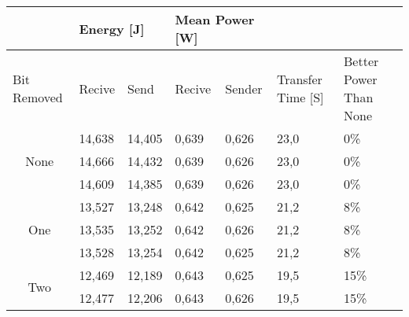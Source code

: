 \begin{table}[h]
\begin{tabular}{c|l|l|l|l|ll}
\cline{2-5}
\multicolumn{1}{l|}{}                       & \multicolumn{2}{l|}{Energy {[}J{]}} & \multicolumn{2}{l|}{Mean Power {[}W{]}} &                                            &                                             \\ \hline
\multicolumn{1}{|l|}{Bit Removed}           & Recive           & Send             & Recive             & Sender             & \multicolumn{1}{l|}{Transfer Time {[}S{]}} & \multicolumn{1}{l|}{Better Power Than None} \\ \hline
\multicolumn{1}{|c|}{\multirow{3}{*}{None}} & 14,638           & 14,405           & 0,639              & 0,626              & \multicolumn{1}{l|}{23,0}                  & \multicolumn{1}{l|}{0\%}                    \\ \cline{2-7} 
\multicolumn{1}{|c|}{}                      & 14,666           & 14,432           & 0,639              & 0,626              & \multicolumn{1}{l|}{23,0}                  & \multicolumn{1}{l|}{0\%}                    \\ \cline{2-7} 
\multicolumn{1}{|c|}{}                      & 14,609           & 14,385           & 0,639              & 0,626              & \multicolumn{1}{l|}{23,0}                  & \multicolumn{1}{l|}{0\%}                    \\ \hline
\multicolumn{1}{|c|}{\multirow{3}{*}{One}}  & 13,527           & 13,248           & 0,642              & 0,625              & \multicolumn{1}{l|}{21,2}                  & \multicolumn{1}{l|}{8\%}                    \\ \cline{2-7} 
\multicolumn{1}{|c|}{}                      & 13,535           & 13,252           & 0,642              & 0,626              & \multicolumn{1}{l|}{21,2}                  & \multicolumn{1}{l|}{8\%}                    \\ \cline{2-7} 
\multicolumn{1}{|c|}{}                      & 13,528           & 13,254           & 0,642              & 0,625              & \multicolumn{1}{l|}{21,2}                  & \multicolumn{1}{l|}{8\%}                    \\ \hline
\multicolumn{1}{|c|}{\multirow{3}{*}{Two}}  & 12,469           & 12,189           & 0,643              & 0,625              & \multicolumn{1}{l|}{19,5}                  & \multicolumn{1}{l|}{15\%}                   \\ \cline{2-7} 
\multicolumn{1}{|c|}{}                      & 12,477           & 12,206           & 0,643              & 0,626              & \multicolumn{1}{l|}{19,5}                  & \multicolumn{1}{l|}{15\%}                   \\ \cline{2-7} 

\end{tabular}
\end{table}
